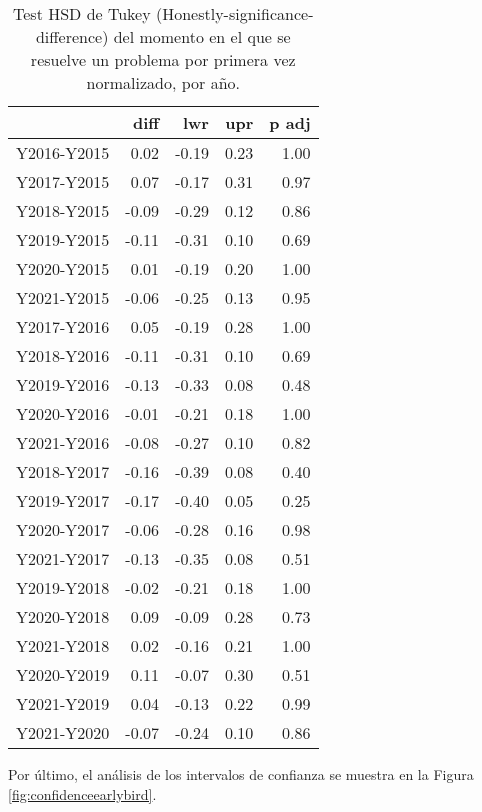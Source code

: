 \begin{table}[H]
\centering
\caption{Test HSD de Tukey (Honestly-significance-difference) del momento en el que se resuelve un problema por primera vez normalizado, por año.}
\label{tab:Tukeyearlybird}
\begin{tabular}{rrrrr}
  \hline
 & diff & lwr & upr & p adj \\ 
  \hline
Y2016-Y2015 & 0.02 & -0.19 & 0.23 & 1.00 \\ 
  Y2017-Y2015 & 0.07 & -0.17 & 0.31 & 0.97 \\ 
  Y2018-Y2015 & -0.09 & -0.29 & 0.12 & 0.86 \\ 
  Y2019-Y2015 & -0.11 & -0.31 & 0.10 & 0.69 \\ 
  Y2020-Y2015 & 0.01 & -0.19 & 0.20 & 1.00 \\ 
  Y2021-Y2015 & -0.06 & -0.25 & 0.13 & 0.95 \\ 
  Y2017-Y2016 & 0.05 & -0.19 & 0.28 & 1.00 \\ 
  Y2018-Y2016 & -0.11 & -0.31 & 0.10 & 0.69 \\ 
  Y2019-Y2016 & -0.13 & -0.33 & 0.08 & 0.48 \\ 
  Y2020-Y2016 & -0.01 & -0.21 & 0.18 & 1.00 \\ 
  Y2021-Y2016 & -0.08 & -0.27 & 0.10 & 0.82 \\ 
  Y2018-Y2017 & -0.16 & -0.39 & 0.08 & 0.40 \\ 
  Y2019-Y2017 & -0.17 & -0.40 & 0.05 & 0.25 \\ 
  Y2020-Y2017 & -0.06 & -0.28 & 0.16 & 0.98 \\ 
  Y2021-Y2017 & -0.13 & -0.35 & 0.08 & 0.51 \\ 
  Y2019-Y2018 & -0.02 & -0.21 & 0.18 & 1.00 \\ 
  Y2020-Y2018 & 0.09 & -0.09 & 0.28 & 0.73 \\ 
  Y2021-Y2018 & 0.02 & -0.16 & 0.21 & 1.00 \\ 
  Y2020-Y2019 & 0.11 & -0.07 & 0.30 & 0.51 \\ 
  Y2021-Y2019 & 0.04 & -0.13 & 0.22 & 0.99 \\ 
  Y2021-Y2020 & -0.07 & -0.24 & 0.10 & 0.86 \\ 
   \hline
\end{tabular}
\end{table}

Por último, el análisis de los intervalos de confianza se muestra en la Figura \ref{fig:confidenceearlybird}.

